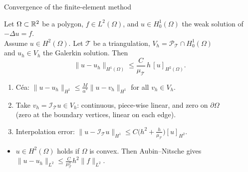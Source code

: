 \begin{frame}{Convergence of the finite-element method}
    \small
    \begin{theorem}
        Let $\Omega \subset {\mathbb R}^2$ be a polygon, $f \in L^2(\Omega)$, and $u \in H^1_0(\Omega)$ the weak solution of $-\Delta u = f$.\\ Assume $u \in H^2(\Omega)$.
        Let $\mathcal T$ be a triangulation, $V_h = \mathcal P_{\mathcal T} \cap H^1_0(\Omega)$\\ and $u_h \in V_h$ the Galerkin solution. Then
        \[
            \|u - u_h\|_{H^1(\Omega)} \le \frac{C}{\mu_{\mathcal T}}\, h\, [u]_{H^2(\Omega)} .
        \]
    \end{theorem}
    \begin{proofsteps}
        \begin{enumerate}
            \item Céa: $\|u - u_h\|_{H^1} \le \frac{M}{\alpha^*} \|u - v_h\|_{H^1}$ for all $v_h \in V_h$.
            \item Take $v_h = \mathcal I_{\mathcal T} u \in V_h$: continuous, piece-wise linear, and zero on $\partial\Omega$\\ (zero at the boundary vertices, linear on each edge).
            \item Interpolation error: $\|u - \mathcal I_{\mathcal T} u\|_{H^1} \le C\big(h^2 + \frac{h}{\mu_{\mathcal T}}\big) [u]_{H^2}$.
        \end{enumerate}
    \end{proofsteps}
    \begin{itemize}
        \item $u \in H^2(\Omega)$ holds if $\Omega$ is convex. Then Aubin--Nitsche gives $\|u - u_h\|_{L^2} \le \frac{C}{\mu_{\mathcal T}^2} h^2 \|f\|_{L^2}$.
    \end{itemize}
\end{frame}

